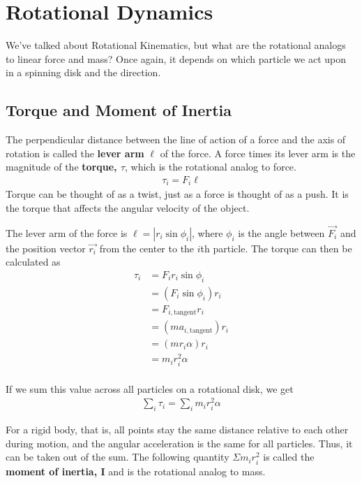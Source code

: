 \documentclass[11pt]{article}
\begin{document}
\section{Rotational Dynamics}

We've talked about Rotational Kinematics, but what are the rotational analogs to linear force and mass? Once again, it depends on which particle we act upon in a spinning disk and the direction. 

\subsection{Torque and Moment of Inertia}

The perpendicular distance between the line of action of a force and the axis of rotation is called the \textbf{lever arm} $\ell$ of the force. A force times its lever arm is the magnitude of the \textbf{torque, $\tau$}, which is the rotational analog to force.
\begin{align*}
    \tau_i = F_i \ell
\end{align*}
Torque can be thought of as a twist, just as a force is thought of as a push. It is the torque that affects the angular velocity of the object. 

The lever arm of the force is $\ell = |r_i \sin\phi_i|$, where $\phi_i$ is the angle between $\Vec{F_i}$ and the position vector $\Vec{r_i}$ from the center to the $i$th particle. The torque can then be calculated as
\begin{align*}
    \tau_i &= F_i r_i \sin\phi_i \\
    &= (F_i \sin\phi_i)r_i \\
    &= F_{i,\text{tangent}} r_i \\
    &= (ma_{i,\text{tangent}})r_i \\
    &= (mr_i \alpha)r_i \\
    &= m_i r_i^2 \alpha \\
\end{align*}

If we sum this value across all particles on a rotational disk, we get
\begin{align*}
    \sum_i \tau_i = \sum_i m_i r_i^2 \alpha
\end{align*}

For a rigid body, that is, all points stay the same distance relative to each other during motion, and the angular acceleration is the same for all particles. Thus, it can be taken out of the sum. The following quantity $\Sigma m_i r_i^2$ is called the \textbf{moment of inertia, I} and is the rotational analog to mass. 
\end{document}
